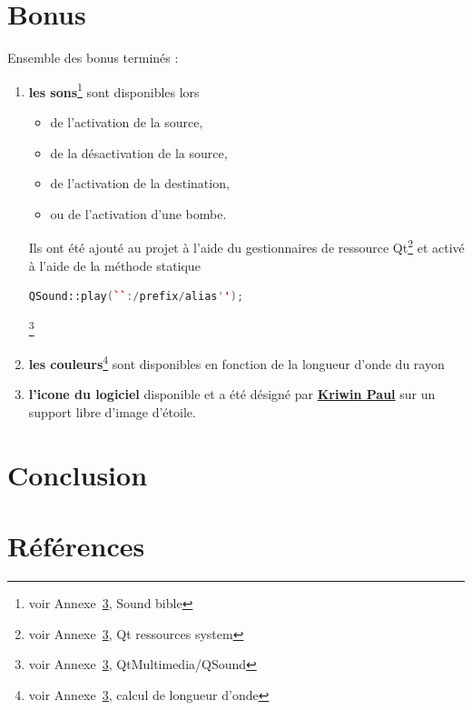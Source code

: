 \documentclass[a4paper,11pt]{report}
\begin{document}
\chapter{Bonus}

Ensemble des bonus terminés :
\begin{enumerate}
	\item \textbf{les sons}\footnote{voir Annexe~\ref{ref}, Sound bible}  sont disponibles lors 
		\begin{itemize}
			\item de l'activation de la source,
			\item de la désactivation de la source,
			\item de l'activation de la destination,
			\item ou de l'activation d'une bombe.
		\end{itemize}
		Ils ont été ajouté au projet à l'aide du gestionnaires de ressource
		Qt\footnote{voir Annexe~\ref{ref}, Qt ressources system} 
		et activé à l'aide de la méthode statique 
		\begin{lstlisting}[language=C++]
		QSound::play(``:/prefix/alias'');
		\end{lstlisting}\footnote{voir Annexe~\ref{ref}, QtMultimedia/QSound}
	\item \textbf{les couleurs}\footnote{voir Annexe~\ref{ref}, calcul de longueur d'onde} 
		sont disponibles en fonction de la longueur d'onde du rayon
	\item \textbf{l'icone du logiciel} disponible et a été désigné par
		\href{mailto:39171@heb.be}{\textbf{Kriwin Paul}} sur un support libre d'image d'étoile.
\end{enumerate}
\chapter{Conclusion}


\appendix


\chapter{Références}\label{ref}
\end{document}
